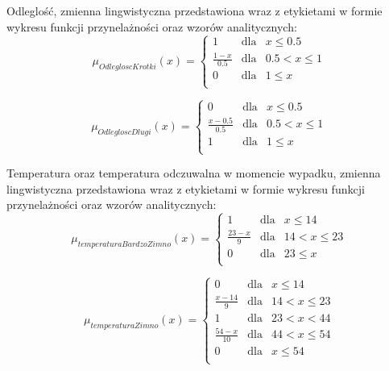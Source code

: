 \documentclass{classrep}
\begin{document}
Odleglość, zmienna lingwistyczna przedstawiona wraz z etykietami w formie wykresu funkcji przynelażności oraz wzorów analitycznych:
\begin{equation}
\mu _{OdlegloscKrotki}(x) =  \left\{ \begin{array}{rcl}
 1 & \mbox{dla} & x  \leq 0.5 \\
\frac{1 - x}{0.5} & \mbox{dla} & 0.5 < x \leq 1\\
0 & \mbox{dla} & 1 \leq x\\
\end{array}\right.
\end{equation}

\begin{equation}
\mu _{OdlegloscDlugi}(x) =  \left\{ \begin{array}{rcl}
 0 & \mbox{dla} & x \leq 0.5 \\
\frac{x - 0.5}{0.5} & \mbox{dla} & 0.5 < x \leq 1\\
1 & \mbox{dla} & 1 \leq x\\
\end{array}\right.
\end{equation}

Temperatura oraz temperatura odczuwalna w momencie wypadku, zmienna lingwistyczna przedstawiona wraz z etykietami w formie wykresu funkcji przynelażności oraz wzorów analitycznych:
\begin{equation}
\mu _{temperaturaBardzoZimno}(x) =  \left\{ \begin{array}{rcl}
 1 & \mbox{dla} & x  \leq 14 \\
\frac{23 - x}{9} & \mbox{dla} & 14 < x \leq 23\\
0 & \mbox{dla} & 23 \leq x\\
\end{array}\right.
\end{equation}

\begin{equation}
\mu _{temperaturaZimno}(x) =  \left\{ \begin{array}{rcl}
 0 & \mbox{dla} & x  \leq 14 \\
\frac{x - 14}{9} & \mbox{dla} & 14 < x \leq 23\\
1 & \mbox{dla} & 23 < x < 44\\
\frac{54 - x}{10} & \mbox{dla} & 44 < x \leq 54\\
 0 & \mbox{dla} & x  \leq 54 \\
\end{array}\right.
\end{equation}
\end{document}
